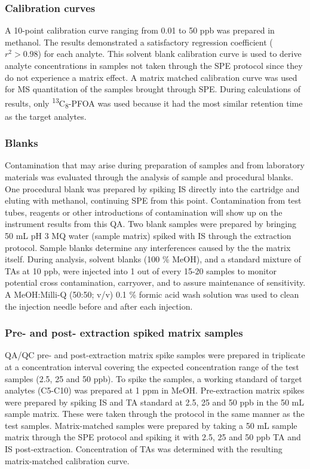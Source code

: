 \subsubsection{Calibration curves}
A 10-point calibration curve ranging from 0.01 to 50 ppb was prepared in methanol. The results demonstrated a satisfactory regression coefficient ($r^2 > 0.98$) for each analyte. This solvent blank calibration curve is used to derive analyte concentrations in samples not taken through the SPE protocol since they do not experience a matrix effect. A matrix matched calibration curve was used for MS quantitation of the samples brought through SPE. 
During calculations of results, only \textsuperscript{13}C\textsubscript{8}-PFOA was used because it had the most similar retention time as the target analytes. 


\subsubsection{Blanks}
Contamination that may arise during preparation of samples and from laboratory materials was evaluated through the analysis of sample and procedural blanks. One procedural blank was prepared by spiking IS directly into the cartridge and eluting with methanol, continuing SPE from this point. Contamination from test tubes, reagents or other introductions of contamination will show up on the instrument results from this QA. Two blank samples were prepared by bringing 50 mL pH 3 MQ water (sample matrix) spiked with IS through the extraction protocol. Sample blanks determine any interferences caused by the the matrix itself. During analysis, solvent blanks (100 \% MeOH), and a standard mixture of TAs at 10 ppb, were injected into 1 out of every 15-20 samples to monitor potential cross contamination, carryover, and to assure maintenance of sensitivity. A MeOH:Milli-Q (50:50; v/v) 0.1 \% formic acid wash solution was used to clean the injection needle before and after each injection.

\subsubsection{Pre- and post- extraction spiked matrix samples}
QA/QC pre- and post-extraction matrix spike samples were prepared in triplicate at a concentration interval covering the expected concentration range of the test samples (2.5, 25 and 50 ppb). To spike the samples, a working standard of target analytes (C5-C10) was prepared at 1 ppm in MeOH. Pre-extraction matrix spikes were prepared by spiking IS and TA standard at 2.5, 25 and 50 ppb in the 50 mL sample matrix. These were taken through the protocol in the same manner as the test samples. Matrix-matched samples were prepared by taking a 50 mL sample matrix through the SPE protocol and spiking it with 2.5, 25 and 50 ppb TA and IS post-extraction. Concentration of TAs was determined with the resulting matrix-matched calibration curve. 

